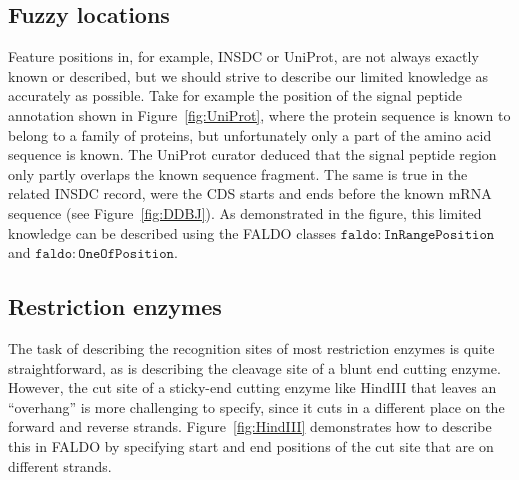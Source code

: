 \subsection*{Fuzzy locations}
Feature positions in, for example, INSDC or UniProt, are not always exactly known or described, but we should strive to describe our limited knowledge as accurately as possible.
Take for example the position of the signal peptide annotation shown in Figure~\ref{fig:UniProt}, 
where the protein sequence is known to belong to a family of proteins,
but unfortunately only a part of the amino acid sequence is known. 
The UniProt curator deduced that the signal peptide region only partly overlaps the known sequence fragment.
The same is true in the related INSDC record, were the CDS starts and ends before the known mRNA sequence (see Figure~\ref{fig:DDBJ}).
As demonstrated in the figure, this limited knowledge can be described using the FALDO classes $\mathtt{faldo\colon{}InRangePosition}$ and $\mathtt{faldo\colon{}OneOfPosition}$.

\subsection*{Restriction enzymes}

The task of describing the recognition sites of most restriction
enzymes is quite straightforward, as is describing the cleavage site
of a blunt end cutting enzyme.
However, the cut site of a sticky-end cutting enzyme like HindIII that
leaves an ``overhang'' is more challenging to specify, since it cuts
in a different place on the forward and reverse strands.
Figure~\ref{fig:HindIII} demonstrates how to describe this in FALDO by
specifying start and end positions of the cut site that are on
different strands.

